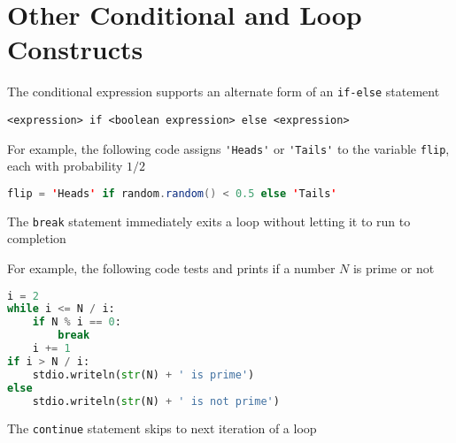 \documentclass[8pt,a4paper,compress]{beamer}
\begin{document}
\section{Other Conditional and Loop Constructs}
\begin{frame}[fragile]
\pause

The conditional expression supports an alternate form of an \lstinline$if-else$ statement
 
\begin{lstlisting}[language={}]
<expression> if <boolean expression> else <expression>
\end{lstlisting}

For example, the following code assigns \lstinline{'Heads'} or \lstinline{'Tails'} to the variable \lstinline{flip}, each with probability $1/2$

\begin{lstlisting}[language=Java]
flip = 'Heads' if random.random() < 0.5 else 'Tails'
\end{lstlisting}

\pause
\bigskip

The \lstinline{break} statement immediately exits a loop without letting it to run to completion

\pause
\bigskip

For example, the following code tests and prints if a number $N$ is prime or not
\begin{lstlisting}[language=Python]
i = 2
while i <= N / i:
    if N % i == 0:
        break
    i += 1
if i > N / i:
    stdio.writeln(str(N) + ' is prime')
else 
    stdio.writeln(str(N) + ' is not prime')
\end{lstlisting}

\pause
\bigskip

The \lstinline{continue} statement skips to next iteration of a loop
\end{frame}
\end{document}
